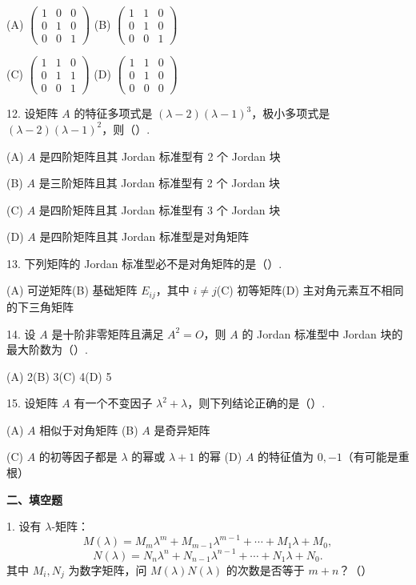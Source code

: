 \documentclass[UTF8, 12pt, fontset=fandol, oneside]{ctexart}
\begin{document}
(A) $\left(\begin{array}{ccc}1&0&0\\0&1&0\\0&0&1\end{array}\right)$\quad
(B) $\left(\begin{array}{ccc}1&1&0\\0&1&0\\0&0&1\end{array}\right)$

(C) $\left(\begin{array}{ccc}1&1&0\\0&1&1\\0&0&1\end{array}\right)$\quad
(D) $\left(\begin{array}{ccc}1&1&0\\0&1&0\\0&0&0\end{array}\right)$

12. 设矩阵 $A$ 的特征多项式是 $(\lambda-2)(\lambda-1)^3$，极小多项式是 $(\lambda-2)(\lambda-1)^2$，则（\quad）.

(A) $A$ 是四阶矩阵且其 Jordan 标准型有 2 个 Jordan 块

(B) $A$ 是三阶矩阵且其 Jordan 标准型有 2 个 Jordan 块

(C) $A$ 是四阶矩阵且其 Jordan 标准型有 3 个 Jordan 块

(D) $A$ 是四阶矩阵且其 Jordan 标准型是对角矩阵

13. 下列矩阵的 Jordan 标准型必不是对角矩阵的是（\quad）.

(A) 可逆矩阵\quad (B) 基础矩阵 $E_{ij}$，其中 $i\ne j$\quad (C) 初等矩阵\quad (D) 主对角元素互不相同的下三角矩阵

14. 设 $A$ 是十阶非零矩阵且满足 $A^2=O$，则 $A$ 的 Jordan 标准型中 Jordan 块的最大阶数为（\quad）.

(A) 2\quad (B) 3\quad (C) 4\quad (D) 5

15. 设矩阵 $A$ 有一个不变因子 $\lambda^2+\lambda$，则下列结论正确的是（\quad）.

(A) $A$ 相似于对角矩阵\quad
(B) $A$ 是奇异矩阵

(C) $A$ 的初等因子都是 $\lambda$ 的幂或 $\lambda+1$ 的幂\quad
(D) $A$ 的特征值为 $0,-1$（有可能是重根）

\noindent\textbf{二、填空题}

1. 设有 $\lambda$-矩阵：
\[
M(\lambda)=M_m\lambda^m+M_{m-1}\lambda^{m-1}+\cdots+M_1\lambda+M_0,
\]
\[
N(\lambda)=N_n\lambda^n+N_{n-1}\lambda^{n-1}+\cdots+N_1\lambda+N_0.
\]
其中 $M_i,N_j$ 为数字矩阵，问 $M(\lambda)N(\lambda)$ 的次数是否等于 $m+n$？（\quad）
\end{document}
